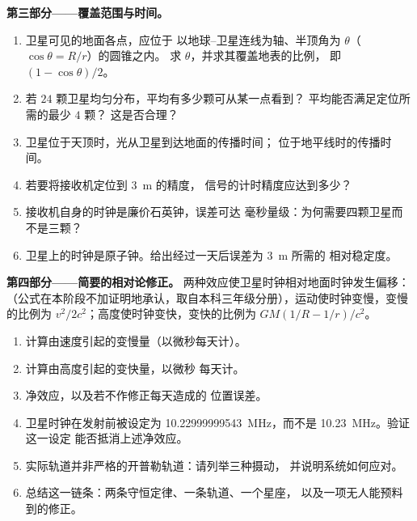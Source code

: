 \begin{problem}
\medskip
\noindent\textbf{第三部分——覆盖范围与时间。}
\begin{enumerate}[resume]
  \item 卫星可见的地面各点，应位于
        以地球–卫星连线为轴、半顶角为 $\theta$（$\cos\theta = R/r$）的圆锥之内。
        求 $\theta$，并求其覆盖地表的比例，
        即 $(1 - \cos\theta)/2$。
  \item 若 $24$ 颗卫星均匀分布，平均有多少颗可从某一点看到？
        平均能否满足定位所需的最少 $4$ 颗？
        这是否合理？
  \item 卫星位于天顶时，光从卫星到达地面的传播时间；
        位于地平线时的传播时间。
  \item 若要将接收机定位到 \qty{3}{m} 的精度，
        信号的计时精度应达到多少？
  \item 接收机自身的时钟是廉价石英钟，误差可达
        毫秒量级：为何需要四颗卫星而不是三颗？
  \item 卫星上的时钟是原子钟。给出经过一天后误差为 \qty{3}{m} 所需的
        相对稳定度。
\end{enumerate}

\medskip
\noindent\textbf{第四部分——简要的相对论修正。}
两种效应使卫星时钟相对地面时钟发生偏移：
（公式在本阶段不加证明地承认，取自本科三年级分册），运动使时钟变慢，变慢的比例为
$v^2/2c^2$；高度使时钟变快，变快的比例为 $GM(1/R - 1/r)/c^2$。
\begin{enumerate}[resume]
  \item 计算由速度引起的变慢量（以微秒每天计）。
  \item 计算由高度引起的变快量，以微秒
        每天计。
  \item 净效应，以及若不作修正每天造成的
        位置误差。
  \item 卫星时钟在发射前被设定为
        \qty{10.22999999543}{MHz}，而不是 \qty{10.23}{MHz}。验证这一设定
        能否抵消上述净效应。
  \item 实际轨道并非严格的开普勒轨道：请列举三种摄动，
        并说明系统如何应对。
  \item 总结这一链条：两条守恒定律、一条轨道、一个星座，
        以及一项无人能预料到的修正。
\end{enumerate}
\end{problem}
